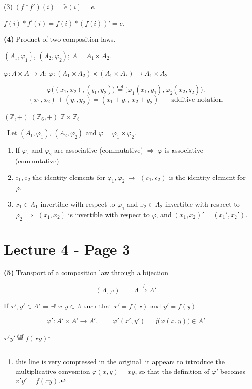 \noindent (3) $(f*f')(i) = \tilde e(i) = e$.

\noindent $f(i)*f'(i) = f(i)*(f(i))' = e$.

\bigskip
\noindent\textbf{(4)} Product of two composition laws.

\noindent $(A_1,\varphi_1)$, $(A_2,\varphi_2)$; $A = A_1\times A_2$.

\noindent $\varphi : A\times A \to A$; \quad $\varphi : (A_1\times A_2)\times(A_1\times A_2) \to A_1\times A_2$

\[
\varphi\big((x_1,x_2),(y_1,y_2)\big) \overset{\text{def}}{=} \big(\varphi_1(x_1,y_1),\varphi_2(x_2,y_2)\big).
\]
\[
(x_1,x_2)+(y_1,y_2) = (x_1+y_1,\,x_2+y_2) \quad \text{-- additive notation.}
\]

\noindent $(\mathbb{Z},+)$ \qquad $(\mathbb{Z}_6,+)$ \qquad $\mathbb{Z}\times\mathbb{Z}_6$

\bigskip
\noindent{} \ Let $(A_1,\varphi_1)$, $(A_2,\varphi_2)$ and $\varphi = \varphi_1\times\varphi_2$.

\begin{enumerate}
\item[(1)] If $\varphi_1$ and $\varphi_2$ are associative (commutative) $\Rightarrow$ $\varphi$ is associative (commutative)
\item[(2)] $e_1,e_2$ the identity elements for $\varphi_1,\varphi_2$ $\Rightarrow$ $(e_1,e_2)$ is the identity element for $\varphi$.
\item[(3)] $x_1\in A_1$ invertible with respect to $\varphi_1$ and $x_2\in A_2$ invertible with respect to $\varphi_2$ $\Rightarrow$ $(x_1,x_2)$ is invertible with respect to $\varphi$, and $(x_1,x_2)' = (x_1',x_2')$.
\end{enumerate}




\section*{Lecture 4 - Page 3}

\noindent\textbf{(5)} Transport of a composition law through a bijection

\[
(A,\varphi) \qquad A \xrightarrow{f} A'
\]

\noindent If $x',y'\in A' \Rightarrow \exists!\, x,y\in A$ such that $x'=f(x)$ and $y'=f(y)$

\[
\varphi' : A'\times A' \to A', \qquad \varphi'(x',y') = f\big(\varphi(x,y)\big) \in A'
\]

\noindent [notation: $\varphi(x,y)=xy$] \quad $x'y' \overset{\text{def}}{=} f(xy)$\footnote{this line is very compressed in the original; it appears to introduce the multiplicative convention $\varphi(x,y)=xy$, so that the definition of $\varphi'$ becomes $x'y'=f(xy)$.}

